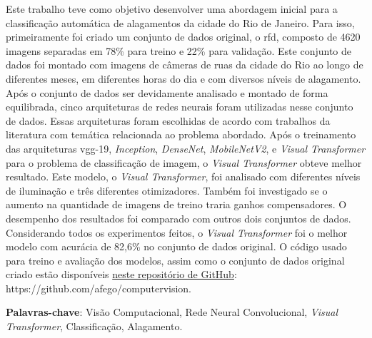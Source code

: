 \begin{resumo}


Este trabalho teve como objetivo desenvolver uma abordagem inicial para a classificação automática de alagamentos da cidade do Rio de Janeiro.
Para isso, primeiramente foi criado um conjunto de dados original, o \acrfull{rfd}, composto de 4620 imagens separadas em 78\% para treino e 22\% para validação.
Este conjunto de dados foi montado com imagens de câmeras de ruas da cidade do Rio ao longo de diferentes meses, em diferentes horas do dia e com diversos níveis de alagamento.
Após o conjunto de dados ser devidamente analisado e montado de forma equilibrada, cinco arquiteturas de redes neurais foram utilizadas nesse conjunto de dados. 
Essas arquiteturas foram escolhidas de acordo com trabalhos da literatura com temática relacionada ao problema abordado.
Após o treinamento das arquiteturas \acrshort{vgg}-19, \textit{Inception}, \textit{DenseNet}, \textit{MobileNetV2}, e \textit{Visual Transformer} para o problema de classificação de imagem, 
o \textit{Visual Transformer} obteve melhor resultado. Este modelo, o \textit{Visual Transformer}, foi analisado com diferentes níveis de iluminação e três diferentes otimizadores.
Também foi investigado se o aumento na quantidade de imagens de treino traria ganhos compensadores. 
O desempenho dos resultados foi comparado com outros dois conjuntos de dados.
Considerando todos os experimentos feitos, o \textit{Visual Transformer} foi o melhor modelo com acurácia de 82,6\% no conjunto de dados original.
O código usado para treino e avaliação dos modelos, assim como o conjunto de dados original criado estão disponíveis \href{https://github.com/afego/computervision}{neste repositório de GitHub}: https://github.com/afego/computervision.

{\hspace{-8mm} \bf{Palavras-chave}}: Visão Computacional, Rede Neural Convolucional, \textit{Visual Transformer}, Classificação, Alagamento.

\end{resumo}

